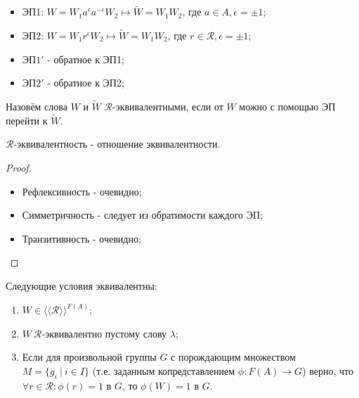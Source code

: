 \begin{itemize}
    \item ЭП1: $W = W_1a^\epsilon a^{-\epsilon}W_2 \mapsto \tilde{W} = W_1W_2$, где $a \in A, \epsilon = \pm 1$;
    \item ЭП2: $W = W_1r^\epsilon W_2 \mapsto \tilde{W} = W_1W_2$, где $r \in \mathcal{R}, \epsilon = \pm 1$;
    \item ЭП$1'$ - обратное к ЭП1;
    \item ЭП$2'$ - обратное к ЭП2;
\end{itemize}
\begin{definition}
    Назовём слова $W$ и $\tilde{W}$ $\mathcal{R}$-эквивалентными, если от $W$ можно с помощью ЭП перейти к $\tilde{W}$.
\end{definition}
\begin{subtheorem}
    $\mathcal{R}$-эквивалентность - отношение эквивалентности.
\end{subtheorem}
\begin{proof}\tab
    \begin{itemize}
        \item Рефлексивность - очевидно;
        \item Симметричность - следует из обратимости каждого ЭП;
        \item Транзитивность - очевидно; 
    \end{itemize}
\end{proof}
\begin{theoremnum}
    Следующие условия эквивалентны:
    \begin{enumerate}
        \item $W \in \langle \langle \mathcal{R} \rangle \rangle^{F(A)}$;
        \item $W \ \mathcal{R}$-эквивалентно пустому слову $\lambda$;
        \item Если для произвольной группы $G$ с порождающим множеством $M = \{g_i \ | \ i \in I\}$ (т.е. заданным копредставлением $\phi: F(A) \rightarrow G$) верно, что $\forall r \in \mathcal{R}: \phi(r) = 1$ в $G$, то $\phi(W) = 1$ в $G$.
    \end{enumerate}
\end{theoremnum}
